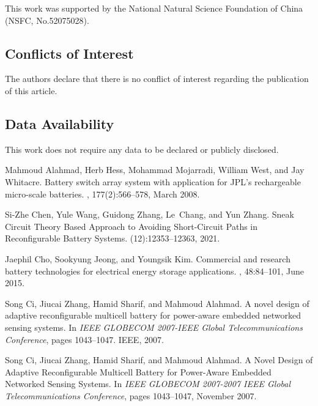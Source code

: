 \documentclass{article}
\begin{document}
This work was supported by the National Natural Science Foundation of China (NSFC, No.52075028).

\subsection*{Conflicts of Interest}

The authors declare that there is no conflict of interest regarding the publication of this article.

\subsection*{Data Availability}

This work does not require any data to be declared or publicly disclosed.
\begin{thebibliography}{10}

Mahmoud Alahmad, Herb Hess, Mohammad Mojarradi, William West, and Jay Whitacre.
\newblock Battery switch array system with application for {{JPL}}'s
  rechargeable micro-scale batteries.
, 177(2):566--578, March 2008.

Si-Zhe Chen, Yule Wang, Guidong Zhang, Le~Chang, and Yun Zhang.
\newblock Sneak {{Circuit Theory Based Approach}} to {{Avoiding Short-Circuit
  Paths}} in {{Reconfigurable Battery Systems}}.
(12):12353--12363, 2021.

Jaephil Cho, Sookyung Jeong, and Youngsik Kim.
\newblock Commercial and research battery technologies for electrical energy
  storage applications.
, 48:84--101, June
  2015.

Song Ci, Jiucai Zhang, Hamid Sharif, and Mahmoud Alahmad.
\newblock A novel design of adaptive reconfigurable multicell battery for
  power-aware embedded networked sensing systems.
\newblock In {\em IEEE GLOBECOM 2007-IEEE Global Telecommunications
  Conference}, pages 1043--1047. IEEE, 2007.

Song Ci, Jiucai Zhang, Hamid Sharif, and Mahmoud Alahmad.
\newblock A {{Novel Design}} of {{Adaptive Reconfigurable Multicell Battery}}
  for {{Power-Aware Embedded Networked Sensing Systems}}.
\newblock In {\em {{IEEE GLOBECOM}} 2007-2007 {{IEEE Global Telecommunications
  Conference}}}, pages 1043--1047, November 2007.


\end{thebibliography}
\end{document}
